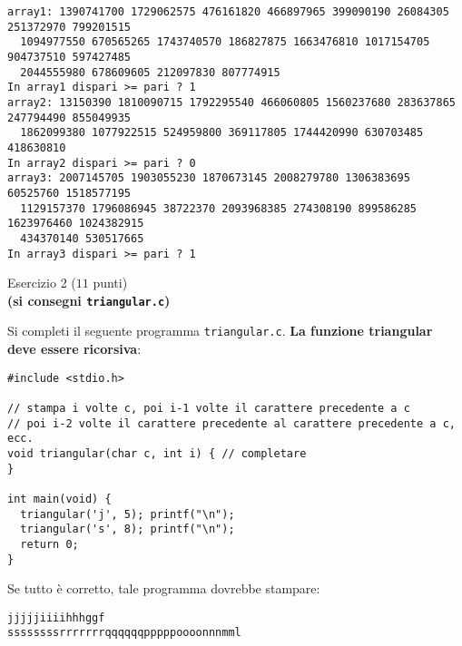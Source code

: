 \documentclass[12pt]{article}
\begin{document}
\begin{mdframed}[backgroundcolor=lightgrey] 
{\small\begin{verbatim}
array1: 1390741700 1729062575 476161820 466897965 399090190 26084305 251372970 799201515
  1094977550 670565265 1743740570 186827875 1663476810 1017154705 904737510 597427485
  2044555980 678609605 212097830 807774915 
In array1 dispari >= pari ? 1
array2: 13150390 1810090715 1792295540 466060805 1560237680 283637865 247794490 855049935
  1862099380 1077922515 524959800 369117805 1744420990 630703485 418630810 
In array2 dispari >= pari ? 0
array3: 2007145705 1903055230 1870673145 2008279780 1306383695 60525760 1518577195
  1129157370 1796086945 38722370 2093968385 274308190 899586285 1623976460 1024382915
  434370140 530517665 
In array3 dispari >= pari ? 1
\end{verbatim}}
\end{mdframed}

\begin{center}
  {\Large Esercizio 2} ($11$ punti)\\
  \textbf{(si consegni \texttt{triangular.c})}
\end{center}
%
Si completi il seguente programma \texttt{triangular.c}.
\textbf{La funzione triangular deve essere ricorsiva}:

\begin{center}
  \begin{lstlisting}[language=myC]
#include <stdio.h>

// stampa i volte c, poi i-1 volte il carattere precedente a c
// poi i-2 volte il carattere precedente al carattere precedente a c, ecc.
void triangular(char c, int i) { // completare
}

int main(void) {
  triangular('j', 5); printf("\n");
  triangular('s', 8); printf("\n");
  return 0;
}
  \end{lstlisting}
\end{center}

Se tutto \`e corretto, tale programma dovrebbe stampare:

\begin{mdframed}[backgroundcolor=lightgrey] 
{\small\begin{verbatim}
jjjjjiiiihhhggf
ssssssssrrrrrrrqqqqqqpppppoooonnnmml
\end{verbatim}}
\end{mdframed}
\end{document}
